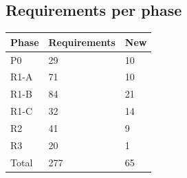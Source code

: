\subsection*{Requirements per phase}
\begin{longtable}{@{}P{0.14\textwidth}P{0.16\textwidth}P{0.12\textwidth}@{}}
\toprule Phase & Requirements & New\\\midrule
P0 & 29 & 10\\
R1-A & 71 & 10\\
R1-B & 84 & 21\\
R1-C & 32 & 14\\
R2 & 41 & 9\\
R3 & 20 & 1\\
\midrule Total & 277 & 65\\
\bottomrule
\end{longtable}


